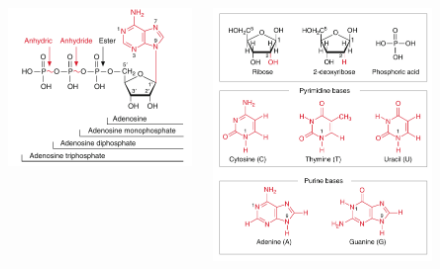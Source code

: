 \documentclass[11pt,ignorenonframetext,aspectratio=169]{beamer}
\begin{document}
\begin{frame}{}
\protect\hypertarget{section-4}{}

\begin{figure}
  \begin{columns}[T,onlytextwidth]

  \begin{center}
  \includegraphics[width=0.90\linewidth]{../images/nucleotide_blocks1.png}
  \end{center}
  
  \begin{center}
  \includegraphics[width=0.80\linewidth]{../images/nucleotide_blocks.png}
  \end{center}
  

\end{columns}
\end{figure}
\end{frame}
\end{document}
